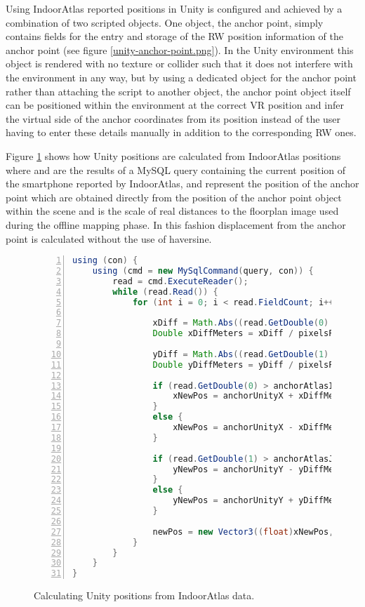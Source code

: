 Using IndoorAtlas reported positions in Unity is configured and achieved by a combination of two scripted objects. One object, the anchor point, simply contains fields for the entry and storage of the RW position information of the anchor point (see figure \ref{unity-anchor-point.png}). In the Unity environment this object is rendered with no texture or collider such that it does not interfere with the environment in any way, but by using a dedicated object for the anchor point rather than attaching the script to another object, the anchor point object itself can be positioned within the environment at the correct VR position and infer the virtual side of the anchor coordinates from its position instead of the user having to enter these details manually in addition to the corresponding RW ones.

Figure \ref{unity-no-haversine} shows how Unity positions are calculated from IndoorAtlas positions where  and  are the results of a MySQL query containing the current position of the smartphone reported by IndoorAtlas,  and  represent the position of the anchor point which are obtained directly from the position of the anchor point object within the scene and  is the scale of real distances to the floorplan image used during the offline mapping phase. In this fashion displacement from the anchor point is calculated without the use of haversine.

\begin{figure}[h]
\begin{lstlisting}[language=Java, numbers=left, numberstyle=\small, stepnumber=1, frame=single, breaklines=true, backgroundcolor=\color{codebackground}, showstringspaces=false]
using (con) {
    using (cmd = new MySqlCommand(query, con)) {
        read = cmd.ExecuteReader();
        while (read.Read()) {
            for (int i = 0; i < read.FieldCount; i++) {

                xDiff = Math.Abs((read.GetDouble(0) - anchorAtlasI));
                Double xDiffMeters = xDiff / pixelsPerMeter;

                yDiff = Math.Abs((read.GetDouble(1) - anchorAtlasJ));
                Double yDiffMeters = yDiff / pixelsPerMeter;

                if (read.GetDouble(0) > anchorAtlasI) {
                    xNewPos = anchorUnityX + xDiffMeters;
                }
                else {
                    xNewPos = anchorUnityX - xDiffMeters;
                }

                if (read.GetDouble(1) > anchorAtlasJ) {
                    yNewPos = anchorUnityY - yDiffMeters;
                }
                else {
                    yNewPos = anchorUnityY + yDiffMeters;
                }

                newPos = new Vector3((float)xNewPos, (float)transform.position.y, (float)yNewPos);
            }
        }
    }
}
\end{lstlisting}
\caption{Calculating Unity positions from IndoorAtlas data.}
\label{unity-no-haversine}
\end{figure}

